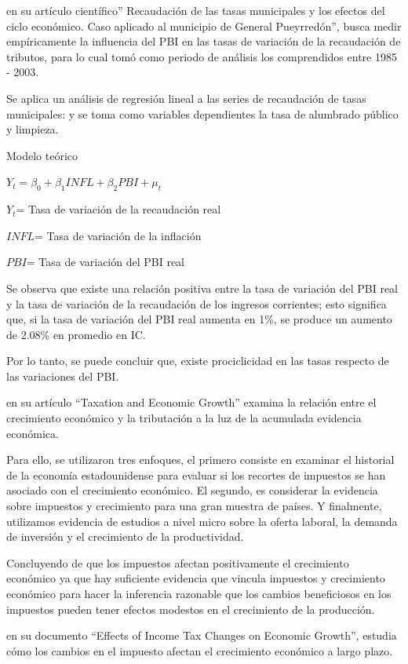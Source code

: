\documentclass[
  letterpaper,
]{article}
\begin{document}
\textcite{mingo_recaudacion_2003} en su artículo científico''
Recaudación de las tasas municipales y los efectos del ciclo económico.
Caso aplicado al municipio de General Pueyrredón'', busca medir
empíricamente la influencia del PBI en las tasas de variación de la
recaudación de tributos, para lo cual tomó como periodo de análisis los
comprendidos entre 1985 - 2003.

Se aplica un análisis de regresión lineal a las series de recaudación de
tasas municipales: y se toma como variables dependientes la tasa de
alumbrado público y limpieza.

Modelo teórico

\(Y_t=β_0+β_{1}INFL+β_{2}PBI+μ_t\)

\(Y_t\)= Tasa de variación de la recaudación real

\(INFL\)= Tasa de variación de la inflación

\(PBI\)= Tasa de variación del PBI real

Se observa que existe una relación positiva entre la tasa de variación
del PBI real y la tasa de variación de la recaudación de los ingresos
corrientes; esto significa que, si la tasa de variación del PBI real
aumenta en 1\%, se produce un aumento de 2.08\% en promedio en IC.

Por lo tanto, se puede concluir que, existe prociclicidad en las tasas
respecto de las variaciones del PBI.

\textcite{engen_taxation_1996} en su artículo ``Taxation and Economic
Growth'' examina la relación entre el crecimiento económico y la
tributación a la luz de la acumulada evidencia económica.

Para ello, se utilizaron tres enfoques, el primero consiste en examinar
el historial de la economía estadounidense para evaluar si los recortes
de impuestos se han asociado con el crecimiento económico. El segundo,
es considerar la evidencia sobre impuestos y crecimiento para una gran
muestra de países. Y finalmente, utilizamos evidencia de estudios a
nivel micro sobre la oferta laboral, la demanda de inversión y el
crecimiento de la productividad.

Concluyendo de que los impuestos afectan positivamente el crecimiento
económico ya que hay suficiente evidencia que vincula impuestos y
crecimiento económico para hacer la inferencia razonable que los cambios
beneficiosos en los impuestos pueden tener efectos modestos en el
crecimiento de la producción.

\textcite{gale_effects_2014} en su documento ``Effects of Income Tax
Changes on Economic Growth'', estudia cómo los cambios en el impuesto
afectan el crecimiento económico a largo plazo.
\end{document}
